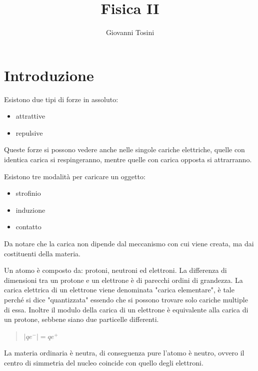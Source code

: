\documentclass[a4paper, 12pt]{book}
\author{Giovanni Tosini}
\title{Fisica II}
\date{ }
\theoremstyle{plain}
\begin{document}
\begin{titlepage}
    \maketitle
\end{titlepage}

\frontmatter %
\tableofcontents
\mainmatter %

\chapter{Introduzione}

Esistono due tipi di forze in assoluto:
\begin{itemize}
    \item  attrattive
    \item repulsive
\end{itemize}
Queste forze si possono vedere anche nelle singole cariche elettriche, quelle con identica carica
si respingeranno, mentre quelle con carica opposta si attrarranno.

Esistono tre modalità per caricare un oggetto:
\begin{itemize}
    \item strofinio
    \item induzione
    \item contatto
\end{itemize}
Da notare che la carica non dipende dal meccanismo con cui viene creata, ma dai costituenti
della materia.
\begin{center}
    \textbf{\textbf{
    }}    
\end{center}
Un atomo è composto da: protoni, neutroni ed elettroni. La differenza di dimensioni tra un protone
e un elettrone è di parecchi ordini di grandezza. La carica elettrica di un elettrone viene 
denominata "carica elementare", è tale perché si dice "quantizzata" essendo che si possono trovare solo
cariche multiple di essa. Inoltre il modulo della carica di un elettrone è equivalente alla carica di
 un protone, sebbene siano due particelle differenti.
 \begin{quote}
     \begin{math}
         |qe^-| = qe^+
     \end{math}
 \end{quote}
 La materia ordinaria è neutra, di conseguenza pure l'atomo è neutro, ovvero il centro di 
 simmetria del nucleo coincide con quello degli elettroni.
\end{document}
